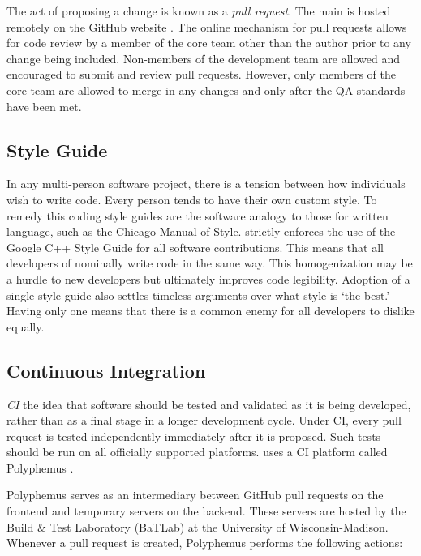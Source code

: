 The act of proposing a change is known as a \emph{pull request}. The main \Cyclus is 
hosted remotely on the GitHub website \cite{dabbish_social_2012}. The online
mechanism for pull requests allows for code review by a member of the \Cyclus 
core team other than the author prior to any change being included. Non-members
of the \Cyclus development team are allowed and encouraged to submit and review 
pull requests. However, only members of the \Cyclus core team are allowed to 
merge in any changes and only after the \gls{QA} standards have been met.

\subsection{Style Guide}

In any multi-person software project, there is a tension between how individuals
wish to write code. Every person tends to have their own custom style. To remedy this
coding style guides are the software analogy to those for written language,
such as the Chicago Manual of Style. \Cyclus strictly enforces the use of the 
Google C++ Style Guide \cite{weinberger_google_2008} for all software contributions.
This means that all developers of \Cyclus nominally write \Cyclus code in the same 
way.  This homogenization may be a hurdle to new developers but ultimately 
improves code legibility. Adoption of a single style guide also settles
timeless arguments over what style is `the best.' Having only one means that 
there is a common enemy for all developers to dislike equally.

\subsection{Continuous Integration}
\label{sec:qa-ci}

\emph{\acrfull{CI}} the idea that software should be tested and validated 
as it is being developed, rather than as a final stage in a longer development 
cycle.  Under \gls{CI}, every pull request is tested independently immediately after 
it is proposed. Such tests should be run on all officially supported platforms. 
\Cyclus uses a \gls{CI} platform called Polyphemus \cite{scopatz_polyphemus_2014}. 

Polyphemus serves as an intermediary between GitHub pull requests on the frontend 
and temporary \Cyclus servers on the backend. These servers are hosted by 
the Build \& Test Laboratory (BaTLab) \cite{uw_batlab_team_batlab_2014} at the University of 
Wisconsin-Madison. Whenever a pull request is created, Polyphemus performs 
the following actions:

